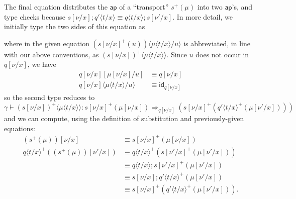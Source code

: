 \documentclass[10pt]{article}
\theoremstyle{definition}
\newcommand{\tcell}{\Rightarrow}
\newcommand{\id}{\mathsf{id}}
\newcommand\TypeTwo[4]{\ensuremath{#1 \vdash #2 :  #3 \tcell #4}}
\newcommand\TermTwoT[5]{\ensuremath{#1 \vdash {#2} : #3 \tcell_{#5} #4}}
\newcommand\TrPlus[2]{\ensuremath{{#1}^+(#2)}}
\newcommand\ap[2]{\ensuremath{#1 \langle #2 \rangle }}
\newcommand\ApPlus[2]{\ensuremath{{#1}^+ \langle #2 \rangle }}
\begin{document}
The final equation distributes the $\mathsf{ap}$ of a ``transport'' 
$\TrPlus{s}{\mu}$ into two $\mathsf{ap}$'s, and type checks because 
$s[\nu/x];\ap{q'}{t/x} \equiv \ap{q}{t/x};s[\nu'/x]$.
In more detail, we initially type the two sides of this equation as
where in the given equation $\ap{(\TrPlus{s[\nu/x]}{u})}{\ap{\mu}{t/x}/u}$ is abbreviated, in line with our above conventions, as $\ApPlus{(s[\nu/x])}{\ap{\mu}{t/x}}$.
Since $u$ does not occur in $q[\nu/x]$, we have
\begin{align*}
  q[\nu/x][\mu[\nu/x]/u] &\equiv q[\nu/x]\\
  \ap{q[\nu/x]}{\ap{\mu}{t/x}/u} &\equiv \id_{q[\nu/x]}
\end{align*}
so the second type reduces to
\[ \TermTwoT{\gamma}{\ApPlus{(s[\nu/x])}{\ap{\mu}{t/x}}}{\TrPlus{s[\nu/x]}{\mu[\nu/x]}}{(\TrPlus{s[\nu/x]}{\TrPlus{\ap{q'}{t/x}}{\mu[\nu'/x]}})}{q[\nu/x]}
\]
and we can compute, using the definition of substitution and previously-given equations:
\begin{align*}
  (\TrPlus{s}{\mu})[\nu/x] &\equiv \TrPlus{s[\nu/x]}{\mu[\nu/x]}\\
  \TrPlus{\ap{q}{t/x}}{(\TrPlus{s}{\mu})[\nu'/x]}
  &\equiv \TrPlus{\ap{q}{t/x}}{\TrPlus{s[\nu'/x]}{\mu[\nu'/x]}}\\
  &\equiv \TrPlus{\ap{q}{t/x};s[\nu'/x]}{\mu[\nu'/x]}\\
  &\equiv \TrPlus{s[\nu/x];\ap{q'}{t/x}}{\mu[\nu'/x]}\\
  &\equiv \TrPlus{s[\nu/x]}{\TrPlus{\ap{q'}{t/x}}{\mu[\nu'/x]}}.
\end{align*}
\end{document}
